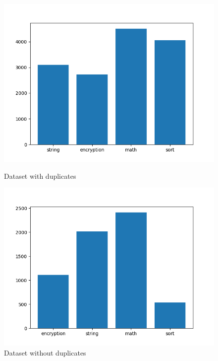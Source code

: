 \documentclass[11pt]{article}
\begin{document}
	\begin{figure}[ht]
		\centering
		\begin{minipage}{.5\textwidth}
		  \centering
		  \includegraphics[width=\linewidth]{assets/dataset.png}
		  \caption{Dataset with duplicates}
		  \label{fig:dataset}
		\end{minipage}%
		\begin{minipage}{.5\textwidth}
		  \centering
		  \includegraphics[width=\linewidth]{assets/datasetnodup.png}
		  \caption{Dataset without duplicates}
		  \label{fig:datasetnodup}
		\end{minipage}
	\end{figure}
\end{document}
